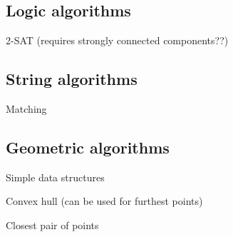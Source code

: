 \documentclass[10pt,a4paper]{article}
\newcommand{\codelisting}[1]{
  }
\begin{document}
\subsection*{Logic algorithms}
2-SAT (requires strongly connected components??)
\codelisting{2sat.java}

\subsection*{String algorithms}
Matching
\codelisting{kmp.java}

\subsection*{Geometric algorithms}
Simple data structures
\codelisting{Point.java}
Convex hull (can be used for furthest points)
\codelisting{convexhull.java}

Closest pair of points
\codelisting{closestpoints.java}
\end{document}
